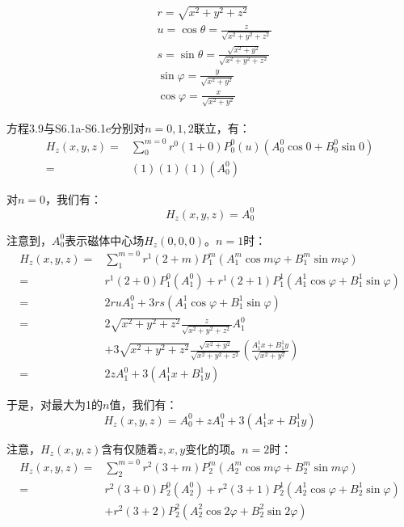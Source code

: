  \begin{align*}%
&r=\sqrt{x^2+y^2+z^2}\tag{S6.1a}\\
&u=\cos\theta=\frac{z}{\sqrt{x^2+y^2+z^2}}\tag{S6.1b}\\
&s=\sin\theta=\frac{\sqrt{x^2+y^2}}{\sqrt{x^2+y^2+z^2}}\tag{S6.1c}\\
&\sin\varphi=\frac{y}{\sqrt{x^2+y^2}}\tag{S6.1d}\\
&\cos\varphi=\frac{x}{\sqrt{x^2+y^2}}\tag{S6.1e}
\end{align*}

方程3.9与S6.1a-S6.1e分别对$n=0,1,2$联立，有：
\begin{equation*}%
\begin{split}
H_z(x,y,z)=&\sum_{0}^{m=0}r^0(1+0)P_{0}^{0}(u)(A_{0}^{0}\cos0 +B_{0}^{0}\sin 0)\\
=&(1)(1)(1)(A_{0}^{0})
\end{split}\tag{S6.2}
\end{equation*}

对$n=0$，我们有：
 \begin{equation*}%
H_z(x,y,z)=A_{0}^{0} \tag{3.126a}
\end{equation*}

注意到，$A_0^0$表示磁体中心场$H_z(0, 0, 0)$。$n=1$时：
\begin{equation*}%
\begin{split}
H_z(x,y,z)=&\sum_{1}^{m=0}r^1(2+m)P_{1}^{m}(A_{1}^{m}\cos m\varphi+B_{1}^{m}\sin m\varphi)\\
=&r^1(2+0)P_{1}^{0}(A_{1}^{0})+r^1(2+1)
P_{1}^{1}(A_{1}^{1}\cos\varphi+B_{1}^{1}\sin\varphi)\\
=&2ruA_{1}^{0}+3rs(A_{1}^{1}\cos\varphi+B_{1}^{1}\sin\varphi)\\
=&2\sqrt{x^2+y^2+z^2}\frac{z}{\sqrt{x^2+y^2+z^2}}A_{1}^{0}\\
&+3\sqrt{x^2+y^2+z^2}\frac{\sqrt{x^2+y^2}}{\sqrt{x^2+y^2+z^2}}\left(\frac{A_{1}^{1}x+B_{1}^{1}y}{\sqrt{x^2+y^2}}\right)\\
=&2zA_{1}^{0}+3(A_{1}^{1}x+B_{1}^{1}y)
\end{split}\tag{S6.3}
\end{equation*}

于是，对最大为1的$n$值，我们有：
\begin{equation*}%
H_z(x,y,z)=A_{0}^{0}+zA_{1}^{0}+3(A_{1}^{1}x+B_{1}^{1}y) \tag{3.126b}
\end{equation*}

注意，$H_z(x, y, z)$含有仅随着$z,x,y$变化的项。$n=2$时：%
 \begin{equation*}%
 \begin{split}
H_z(x,y,z)=&\sum_{2}^{m=0}r^2(3+m)P_{2}^{m}(A_{2}^{m}\cos m\varphi+B_{2}^{m}\sin m\varphi)\\
=&r^2(3+0)P_{2}^{0}(A_{2}^{0})+r^2(3+1)P_{2}^{1}
(A_{2}^{1}\cos\varphi+B_{2}^{1}\sin\varphi)\\
&+r^2(3+2)P_{2}^{2}(A_{2}^{2}\cos 2\varphi+B_{2}^{2}\sin 2\varphi)
 \end{split} \tag{S6.4}
\end{equation*}

